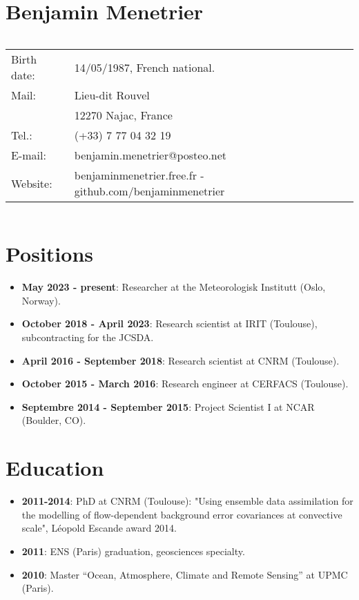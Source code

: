 \documentclass[a4paper,9pt]{scrreprt}
\begin{document}
\section*{{\huge Benjamin Menetrier}}
$  $\\
\large
\begin{tabular}{ll}
Birth date: & 14/05/1987, French national. \\
Mail: &  Lieu-dit Rouvel\\
  & 12270 Najac, France \\
Tel.: & (+33) 7 77 04 32 19 \\
E-mail: & benjamin.menetrier@posteo.net\\
Website: & benjaminmenetrier.free.fr -  github.com/benjaminmenetrier\\
\end{tabular}
$  $\\
\begin{center}
{\vrule depth 0pt height 0.4pt width 8cm}
\end{center}

\section*{Positions}
\begin{itemize}
\item \textbf{May 2023 - present}: Researcher at the Meteorologisk Institutt (Oslo, Norway).\vspace{-0.1cm}
\item \textbf{October 2018 - April 2023}: Research scientist at IRIT (Toulouse), subcontracting for the JCSDA.\vspace{-0.1cm}
\item \textbf{April 2016 - September 2018}: Research scientist at CNRM (Toulouse).\vspace{-0.1cm}
\item \textbf{October 2015 - March 2016}: Research engineer at CERFACS (Toulouse).\vspace{-0.1cm}
\item \textbf{Septembre 2014 - September 2015}: Project Scientist I at NCAR (Boulder, CO).\vspace{-0.1cm}
\end{itemize}

\section*{Education}
\begin{itemize}
\item \textbf{2011-2014}: PhD at CNRM (Toulouse): "Using ensemble data assimilation for the modelling of flow-dependent background error covariances at convective scale", Léopold Escande award 2014.\vspace{-0.1cm}
\item \textbf{2011}: ENS (Paris) graduation, geosciences specialty.\vspace{-0.1cm}
\item \textbf{2010}: Master ``Ocean, Atmosphere, Climate and Remote Sensing'' at UPMC (Paris).\vspace{-0.1cm}
\end{itemize}
\end{document}
